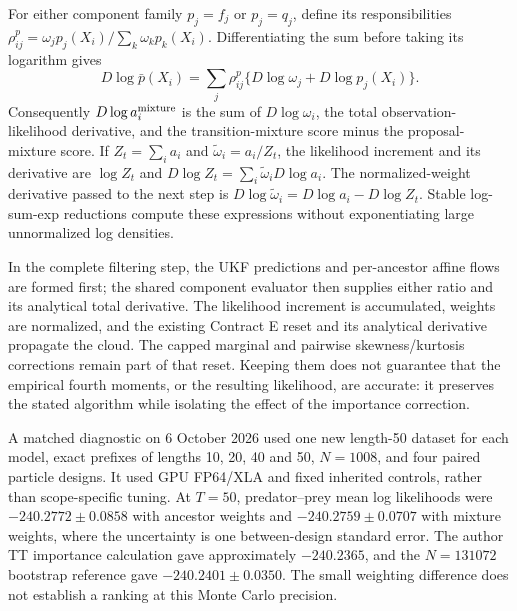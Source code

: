 For either component family $p_j=f_j$ or $p_j=q_j$, define its responsibilities
$\rho_{ij}^{p}=\omega_jp_j(X_i)/\sum_k\omega_kp_k(X_i)$.
Differentiating the sum before taking its logarithm gives
\begin{equation}
 D\log\bar p(X_i)
 =\sum_j\rho_{ij}^{p}
       \{D\log\omega_j+D\log p_j(X_i)\}.
 \label{eq:bf-hd-marginal-responsibility-score}
\end{equation}
Consequently $D\log a_i^{\rm mixture}$ is the sum of
$D\log\omega_i$, the total observation-likelihood derivative, and the
transition-mixture score minus the proposal-mixture score.  If
$Z_t=\sum_i a_i$ and $\widetilde\omega_i=a_i/Z_t$, the likelihood increment
and its derivative are $\log Z_t$ and
$D\log Z_t=\sum_i\widetilde\omega_iD\log a_i$.
The normalized-weight derivative passed to the next step is
$D\log\widetilde\omega_i=D\log a_i-D\log Z_t$.
Stable log-sum-exp reductions compute these expressions without exponentiating
large unnormalized log densities.

In the complete filtering step, the UKF predictions and per-ancestor affine
flows are formed first; the shared component evaluator then supplies either
ratio and its analytical total derivative.  The likelihood increment is
accumulated, weights are normalized, and the existing Contract E reset and
its analytical derivative propagate the cloud.  The capped marginal and
pairwise skewness/kurtosis corrections remain part of that reset.  Keeping
them does not guarantee that the empirical fourth moments, or the resulting
likelihood, are accurate: it preserves the stated algorithm while isolating
the effect of the importance correction.

A matched diagnostic on 6 October 2026 used one new length-50 dataset for each
model, exact prefixes of lengths 10, 20, 40 and 50, $N=1008$, and four paired
particle designs.  It used GPU FP64/XLA and fixed inherited controls, rather
than scope-specific tuning.  At $T=50$, predator--prey mean log likelihoods
were $-240.2772\pm0.0858$ with ancestor weights and
$-240.2759\pm0.0707$ with mixture weights, where the uncertainty is one
between-design standard error.  The author TT importance calculation gave
approximately $-240.2365$, and the $N=131072$ bootstrap reference gave
$-240.2401\pm0.0350$.  The small weighting difference does not establish a
ranking at this Monte Carlo precision.

